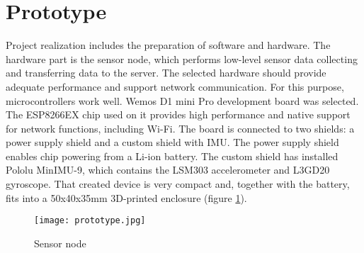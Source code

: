 \section{Prototype}

Project realization includes the preparation of software and hardware. The hardware part is the sensor node, which performs low-level sensor data collecting and transferring data to the server. The selected hardware should provide adequate performance and support network communication. For this purpose, microcontrollers work well. Wemos D1 mini Pro development board was selected. The ESP8266EX chip used on it provides high performance and native support for network functions, including Wi-Fi. The board is connected to two shields: a power supply shield and a custom shield with IMU. The power supply shield enables chip powering from a Li-ion battery. The custom shield has installed Pololu MinIMU-9, which contains the LSM303 accelerometer and L3GD20 gyroscope. That created device is very compact and, together with the battery, fits into a 50x40x35mm 3D-printed enclosure (figure \ref{prototype}).

\begin{figure}[!h]
	\begin{center}
		\texttt{[image: prototype.jpg]}
	\end{center}
	\caption{Sensor node}
	\label{prototype}
\end{figure}


